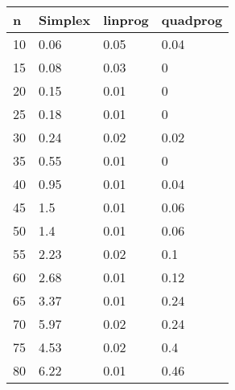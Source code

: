 \begin{tabular}{llll}
n & Simplex & linprog & quadprog \\ 
\hline 
10 & 0.06 & 0.05 & 0.04 \\ 
15 & 0.08 & 0.03 & 0 \\ 
20 & 0.15 & 0.01 & 0 \\ 
25 & 0.18 & 0.01 & 0 \\ 
30 & 0.24 & 0.02 & 0.02 \\ 
35 & 0.55 & 0.01 & 0 \\ 
40 & 0.95 & 0.01 & 0.04 \\ 
45 & 1.5 & 0.01 & 0.06 \\ 
50 & 1.4 & 0.01 & 0.06 \\ 
55 & 2.23 & 0.02 & 0.1 \\ 
60 & 2.68 & 0.01 & 0.12 \\ 
65 & 3.37 & 0.01 & 0.24 \\ 
70 & 5.97 & 0.02 & 0.24 \\ 
75 & 4.53 & 0.02 & 0.4 \\ 
80 & 6.22 & 0.01 & 0.46 \\ 
\hline 
\end{tabular}